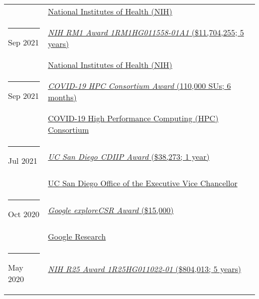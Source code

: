 \documentclass[margin,line]{res}
\begin{document}
\begin{resume}
\begin{longtable}{@{}p{0.7in}p{4in}}
\hspace*{-4mm} \hspace*{-4mm} & \hspace{4mm} \href{https://nih.gov}{National Institutes of Health (NIH)}\\
\hspace*{-4mm} \rule{-1mm}{5mm} Sep 2021 & \href{https://reporter.nih.gov/project-details/10307040}{\textit{NIH RM1 Award 1RM1HG011558-01A1} (\$11,704,255; 5 years)}\\*
\hspace*{-4mm} \hspace*{-4mm} & \hspace{4mm} \href{https://nih.gov}{National Institutes of Health (NIH)}\\
\hspace*{-4mm} \rule{-1mm}{5mm} Sep 2021 & \href{https://www.xsede.org/covid19-hpc-consortium}{\textit{COVID-19 HPC Consortium Award} (110,000 SUs; 6 months)}\\*
\hspace*{-4mm} \hspace*{-4mm} & \hspace{4mm} \href{https://covid19-hpc-consortium.org/}{COVID-19 High Performance Computing (HPC) Consortium}\\
\hspace*{-4mm} \rule{-1mm}{5mm} Jul 2021 & \href{https://academicaffairs.ucsd.edu/evc/cdiip.html}{\textit{UC San Diego CDIIP Award} (\$38,273; 1 year)}\\*
\hspace*{-4mm} \hspace*{-4mm} & \hspace{4mm} \href{https://academicaffairs.ucsd.edu/evc/cdiip.html}{UC San Diego Office of the Executive Vice Chancellor}\\
\hspace*{-4mm} \rule{-1mm}{5mm} Oct 2020 & \href{https://research.google/outreach/explore-csr/recipients/?category=2020}{\textit{Google exploreCSR Award} (\$15,000)}\\*
\hspace*{-4mm} \hspace*{-4mm} & \hspace{4mm} \href{https://research.google/}{Google Research}\\
\hspace*{-4mm} \rule{-1mm}{5mm} May 2020 & \href{https://reporter.nih.gov/project-details/9935824}{\textit{NIH R25 Award 1R25HG011022-01} (\$804,013; 5 years)}\\*

\end{longtable}
\end{resume}
\end{document}

